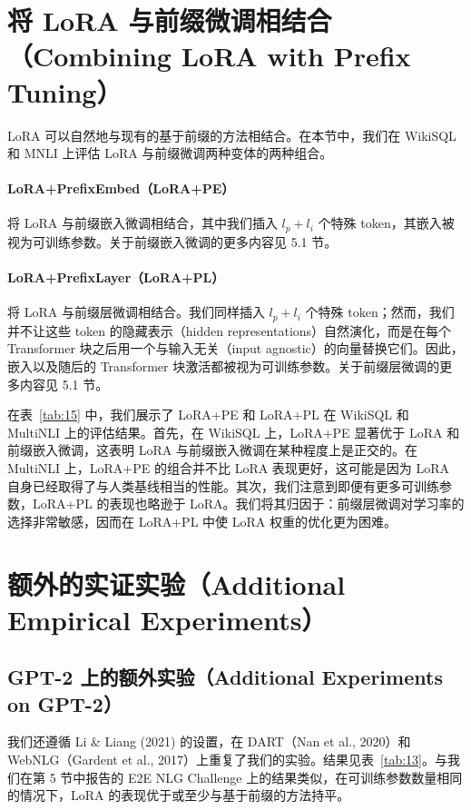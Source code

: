 \documentclass[11pt,UTF8,fontset=fandol]{ctexart}
\begin{document}
\section{将 LoRA 与前缀微调相结合（Combining LoRA with Prefix Tuning）}

LoRA 可以自然地与现有的基于前缀的方法相结合。在本节中，我们在 WikiSQL 和 MNLI 上评估 LoRA 与前缀微调两种变体的两种组合。

\paragraph{LoRA+PrefixEmbed（LoRA+PE）}将 LoRA 与前缀嵌入微调相结合，其中我们插入 $l_p+l_i$ 个特殊 token，其嵌入被视为可训练参数。关于前缀嵌入微调的更多内容见 5.1 节。

\paragraph{LoRA+PrefixLayer（LoRA+PL）}将 LoRA 与前缀层微调相结合。我们同样插入 $l_p+l_i$ 个特殊 token；然而，我们并不让这些 token 的隐藏表示（hidden representations）自然演化，而是在每个 Transformer 块之后用一个与输入无关（input agnostic）的向量替换它们。因此，嵌入以及随后的 Transformer 块激活都被视为可训练参数。关于前缀层微调的更多内容见 5.1 节。

在表~\ref{tab:15} 中，我们展示了 LoRA+PE 和 LoRA+PL 在 WikiSQL 和 MultiNLI 上的评估结果。首先，在 WikiSQL 上，LoRA+PE 显著优于 LoRA 和前缀嵌入微调，这表明 LoRA 与前缀嵌入微调在某种程度上是正交的。在 MultiNLI 上，LoRA+PE 的组合并不比 LoRA 表现更好，这可能是因为 LoRA 自身已经取得了与人类基线相当的性能。其次，我们注意到即便有更多可训练参数，LoRA+PL 的表现也略逊于 LoRA。我们将其归因于：前缀层微调对学习率的选择非常敏感，因而在 LoRA+PL 中使 LoRA 权重的优化更为困难。

\section{额外的实证实验（Additional Empirical Experiments）}

\subsection{GPT-2 上的额外实验（Additional Experiments on GPT-2）}

我们还遵循 Li \& Liang (2021) 的设置，在 DART（Nan et al., 2020）和 WebNLG（Gardent et al., 2017）上重复了我们的实验。结果见表~\ref{tab:13}。与我们在第 5 节中报告的 E2E NLG Challenge 上的结果类似，在可训练参数数量相同的情况下，LoRA 的表现优于或至少与基于前缀的方法持平。
\end{document}
